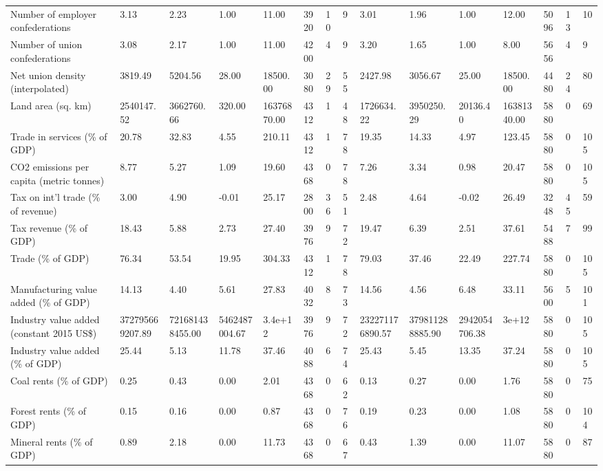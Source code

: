 \begin{longtable}{lllllllllllllll}
\addlinespace
Number of employer confederations & 3.13 & 2.23 & 1.00 & 11.00 & 3920 & 10 & 9 & 3.01 & 1.96 & 1.00 & 12.00 & 5096 & 13 & 10\\
Number of union confederations & 3.08 & 2.17 & 1.00 & 11.00 & 4200 & 4 & 9 & 3.20 & 1.65 & 1.00 & 8.00 & 5656 & 4 & 9\\
Net union density (interpolated) & 3819.49 & 5204.56 & 28.00 & 18500.00 & 3080 & 29 & 55 & 2427.98 & 3056.67 & 25.00 & 18500.00 & 4480 & 24 & 80\\
Land area (sq. km) & 2540147.52 & 3662760.66 & 320.00 & 16376870.00 & 4312 & 1 & 48 & 1726634.22 & 3950250.29 & 20136.40 & 16381340.00 & 5880 & 0 & 69\\
Trade in services (\% of GDP) & 20.78 & 32.83 & 4.55 & 210.11 & 4312 & 1 & 78 & 19.35 & 14.33 & 4.97 & 123.45 & 5880 & 0 & 105\\
\addlinespace
CO2 emissions per capita (metric tonnes) & 8.77 & 5.27 & 1.09 & 19.60 & 4368 & 0 & 78 & 7.26 & 3.34 & 0.98 & 20.47 & 5880 & 0 & 105\\
Tax on int'l trade (\% of revenue) & 3.00 & 4.90 & -0.01 & 25.17 & 2800 & 36 & 51 & 2.48 & 4.64 & -0.02 & 26.49 & 3248 & 45 & 59\\
Tax revenue (\% of GDP) & 18.43 & 5.88 & 2.73 & 27.40 & 3976 & 9 & 72 & 19.47 & 6.39 & 2.51 & 37.61 & 5488 & 7 & 99\\
Trade (\% of GDP) & 76.34 & 53.54 & 19.95 & 304.33 & 4312 & 1 & 78 & 79.03 & 37.46 & 22.49 & 227.74 & 5880 & 0 & 105\\
Manufacturing value added (\% of GDP) & 14.13 & 4.40 & 5.61 & 27.83 & 4032 & 8 & 73 & 14.56 & 4.56 & 6.48 & 33.11 & 5600 & 5 & 101\\
\addlinespace
Industry value added (constant 2015 US\$) & 372795669207.89 & 721681438455.00 & 5462487004.67 & 3.4e+12 & 3976 & 9 & 72 & 232271176890.57 & 379811288885.90 & 2942054706.38 & 3e+12 & 5880 & 0 & 105\\
Industry value added (\% of GDP) & 25.44 & 5.13 & 11.78 & 37.46 & 4088 & 6 & 74 & 25.43 & 5.45 & 13.35 & 37.24 & 5880 & 0 & 105\\
Coal rents (\% of GDP) & 0.25 & 0.43 & 0.00 & 2.01 & 4368 & 0 & 62 & 0.13 & 0.27 & 0.00 & 1.76 & 5880 & 0 & 75\\
Forest rents (\% of GDP) & 0.15 & 0.16 & 0.00 & 0.87 & 4368 & 0 & 76 & 0.19 & 0.23 & 0.00 & 1.08 & 5880 & 0 & 104\\
Mineral rents (\% of GDP) & 0.89 & 2.18 & 0.00 & 11.73 & 4368 & 0 & 67 & 0.43 & 1.39 & 0.00 & 11.07 & 5880 & 0 & 87\\

\end{longtable}
